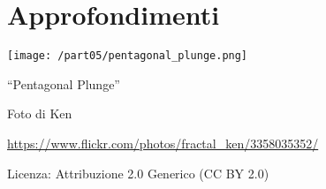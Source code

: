 \part{Approfondimenti}

 \texttt{[image: /part05/pentagonal\_plunge.png]}
   \begin{center}
     {\large ``Pentagonal Plunge''}\par
     Foto di Ken\par
     \url{https://www.flickr.com/photos/fractal_ken/3358035352/}\par
    Licenza: Attribuzione 2.0 Generico (CC BY 2.0)\par
   \end{center}
\clearpage
\cleardoublepage
